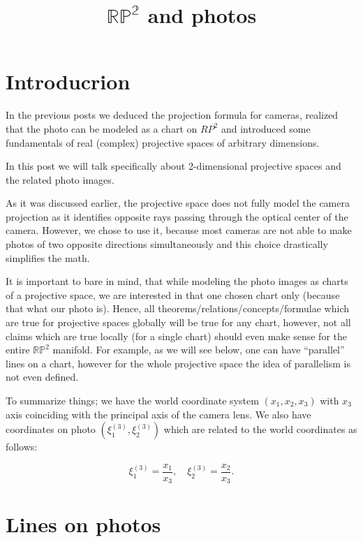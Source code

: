 \documentclass[a4paper,10pt]{article}
\title{$\mathbb{RP^2}$ and photos}
\author{}
\date{}
\begin{document}
\maketitle
\section{Introducrion}

In the previous posts we deduced the projection formula for cameras, realized that the photo can be modeled as a chart on $RP^2$ and introduced some fundamentals of real (complex) projective spaces of arbitrary dimensions. 

In this post we will talk specifically about 2-dimensional projective spaces and the related photo images. 

As it was discussed earlier, the projective space does not fully model the camera  projection as it identifies opposite rays passing through the optical center of  the camera. However, we chose to use it, because most cameras are not able to make photos of two opposite directions simultaneously and this choice drastically simplifies the math. 

It is important to bare in mind, that while modeling the photo images as charts of a projective space, we are interested in that one chosen chart only (because that what our photo is). Hence, all theorems/relations/concepts/formulae which are true for projective spaces globally will be true for any chart, however, not all claims which are true locally (for a single chart) should even make sense for the entire $\mathbb{RP}^2$ manifold. For example, as we will see below, one can have ``parallel'' lines on a chart, however for the whole projective space the idea of parallelism is not even defined.

To summarize things; we have the world coordinate system $(x_1, x_2, x_3)$ with $x_3$ axis coinciding with the principal axis of the camera lens. We also have coordinates on photo $(\xi_1^{(3)}, \xi_2^{(3)})$ which are related to the world coordinates as follows:

\begin{equation}
 \xi_1^{(3)} = \frac{x_1}{x_3}, \quad\xi_2^{(3)} = \frac{x_2}{x_3}.\label{photochart}
\end{equation}


\section{Lines on photos }
\end{document}
